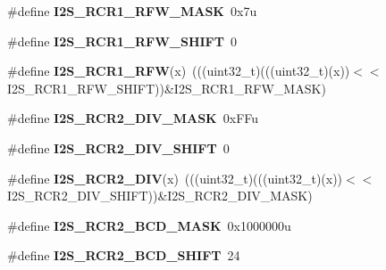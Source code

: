 \begin{DoxyCompactItemize}
\item 
\#define {\bfseries I2\+S\+\_\+\+R\+C\+R1\+\_\+\+R\+F\+W\+\_\+\+M\+A\+SK}~0x7u\hypertarget{group__I2S__Register__Masks_gaa01b4e3c93f7d6e394ae98744b23ce2e}{}\label{group__I2S__Register__Masks_gaa01b4e3c93f7d6e394ae98744b23ce2e}

\item 
\#define {\bfseries I2\+S\+\_\+\+R\+C\+R1\+\_\+\+R\+F\+W\+\_\+\+S\+H\+I\+FT}~0\hypertarget{group__I2S__Register__Masks_ga0377763c289535be469c9c34d4e5db0a}{}\label{group__I2S__Register__Masks_ga0377763c289535be469c9c34d4e5db0a}

\item 
\#define {\bfseries I2\+S\+\_\+\+R\+C\+R1\+\_\+\+R\+FW}(x)~(((uint32\+\_\+t)(((uint32\+\_\+t)(x))$<$$<$I2\+S\+\_\+\+R\+C\+R1\+\_\+\+R\+F\+W\+\_\+\+S\+H\+I\+FT))\&I2\+S\+\_\+\+R\+C\+R1\+\_\+\+R\+F\+W\+\_\+\+M\+A\+SK)\hypertarget{group__I2S__Register__Masks_gabd25b9a6ddd7887e010e4fac7ecb842c}{}\label{group__I2S__Register__Masks_gabd25b9a6ddd7887e010e4fac7ecb842c}

\item 
\#define {\bfseries I2\+S\+\_\+\+R\+C\+R2\+\_\+\+D\+I\+V\+\_\+\+M\+A\+SK}~0x\+F\+Fu\hypertarget{group__I2S__Register__Masks_ga2a4f6e6b8d73e0abf6f0d5b0979182e2}{}\label{group__I2S__Register__Masks_ga2a4f6e6b8d73e0abf6f0d5b0979182e2}

\item 
\#define {\bfseries I2\+S\+\_\+\+R\+C\+R2\+\_\+\+D\+I\+V\+\_\+\+S\+H\+I\+FT}~0\hypertarget{group__I2S__Register__Masks_gaa9a14126d11b963220e6b98c027be2e1}{}\label{group__I2S__Register__Masks_gaa9a14126d11b963220e6b98c027be2e1}

\item 
\#define {\bfseries I2\+S\+\_\+\+R\+C\+R2\+\_\+\+D\+IV}(x)~(((uint32\+\_\+t)(((uint32\+\_\+t)(x))$<$$<$I2\+S\+\_\+\+R\+C\+R2\+\_\+\+D\+I\+V\+\_\+\+S\+H\+I\+FT))\&I2\+S\+\_\+\+R\+C\+R2\+\_\+\+D\+I\+V\+\_\+\+M\+A\+SK)\hypertarget{group__I2S__Register__Masks_gacee150fec7431041bd054a753160464e}{}\label{group__I2S__Register__Masks_gacee150fec7431041bd054a753160464e}

\item 
\#define {\bfseries I2\+S\+\_\+\+R\+C\+R2\+\_\+\+B\+C\+D\+\_\+\+M\+A\+SK}~0x1000000u\hypertarget{group__I2S__Register__Masks_gada87418ab4529692585474e6586d0dc2}{}\label{group__I2S__Register__Masks_gada87418ab4529692585474e6586d0dc2}

\item 
\#define {\bfseries I2\+S\+\_\+\+R\+C\+R2\+\_\+\+B\+C\+D\+\_\+\+S\+H\+I\+FT}~24\hypertarget{group__I2S__Register__Masks_ga13a6f638b14d217719d05d50e7d010ed}{}\label{group__I2S__Register__Masks_ga13a6f638b14d217719d05d50e7d010ed}


\end{DoxyCompactItemize}
